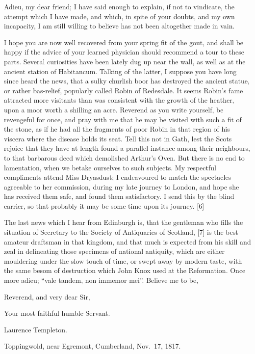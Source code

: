 Adieu, my dear friend; I have said enough to explain, if not to
vindicate, the attempt which I have made, and which, in spite of your
doubts, and my own incapacity, I am still willing to believe has not
been altogether made in vain.

I hope you are now well recovered from your spring fit of the gout, and
shall be happy if the advice of your learned physician should recommend
a tour to these parts. Several curiosities have been lately dug up near
the wall, as well as at the ancient station of Habitancum. Talking of
the latter, I suppose you have long since heard the news, that a sulky
churlish boor has destroyed the ancient statue, or rather bas-relief,
popularly called Robin of Redesdale. It seems Robin's fame attracted
more visitants than was consistent with the growth of the heather, upon
a moor worth a shilling an acre. Reverend as you write yourself, be
revengeful for once, and pray with me that he may be visited with such a
fit of the stone, as if he had all the fragments of poor Robin in that
region of his viscera where the disease holds its seat. Tell this not in
Gath, lest the Scots rejoice that they have at length found a parallel
instance among their neighbours, to that barbarous deed which demolished
Arthur's Oven. But there is no end to lamentation, when we betake
ourselves to such subjects. My respectful compliments attend Miss
Dryasdust; I endeavoured to match the spectacles agreeable to her
commission, during my late journey to London, and hope she has received
them safe, and found them satisfactory. I send this by the blind
carrier, so that probably it may be some time upon its journey. {[}6{]}

The last news which I hear from Edinburgh is, that the gentleman who
fills the situation of Secretary to the Society of Antiquaries of
Scotland, {[}7{]} is the best amateur draftsman in that kingdom, and
that much is expected from his skill and zeal in delineating those
specimens of national antiquity, which are either mouldering under the
slow touch of time, or swept away by modern taste, with the same besom
of destruction which John Knox used at the Reformation. Once more adieu;
``vale tandem, non immemor mei''. Believe me to be,

Reverend, and very dear Sir,

Your most faithful humble Servant.

Laurence Templeton.

Toppingwold, near Egremont, Cumberland, Nov.~17, 1817.